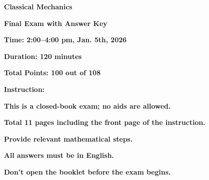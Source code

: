 \documentclass[11pt, a4paper]{article} %
\begin{document}

\setlength{\parindent}{0pt} %
\onehalfspacing				%



\vspace*{0.1cm}				%


\begin{center}
	{\Large \textbf{Classical Mechanics}}
    \vspace*{2mm}

    {\Large \textbf{Final Exam with Answer Key}}
	\vspace{8mm}

{\Large \textbf{Time: 2:00--4:00 pm, Jan. 5th, 2026}}
\vspace*{2mm}

{\Large \textbf{Duration: 120 minutes}}
\vspace*{2mm}

{\Large \textbf{Total Points: 100 out of 108}}
\end{center}
\vspace*{8mm}

{\Large \textbf{Instruction:}}
\vspace*{2mm}

{\Large \textbf{This is a closed-book exam; no aids are allowed.}}
\vspace*{2mm}

{\Large \textbf{Total 11 pages including the front page of the instruction.}}
\vspace*{2mm}

{\Large \textbf{Provide relevant mathematical steps.}}
\vspace*{2mm}

{\Large \textbf{All answers must be in English.}}
\vspace*{2mm}

{\Large \textbf{Don't open the booklet before the exam begins.}}
\vspace{5cm}
\end{document}
